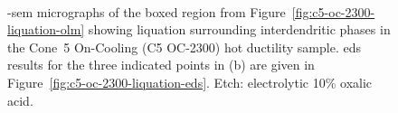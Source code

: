 {\begin{figure}
    \centering
     \\
    \caption{-\gls{sem} micrographs of the boxed region from Figure~\ref{fig:c5-oc-2300-liquation-olm} showing liquation surrounding interdendritic phases in the Cone~5 On-Cooling \protect{} (C5 OC-2300) hot ductility sample. \gls{eds} results for the three indicated points in (b) are given in Figure~\ref{fig:c5-oc-2300-liquation-eds}. Etch: electrolytic 10\% oxalic acid.}
    \label{fig:c5-oc-2300-liquation-sem}
\end{figure}

}

